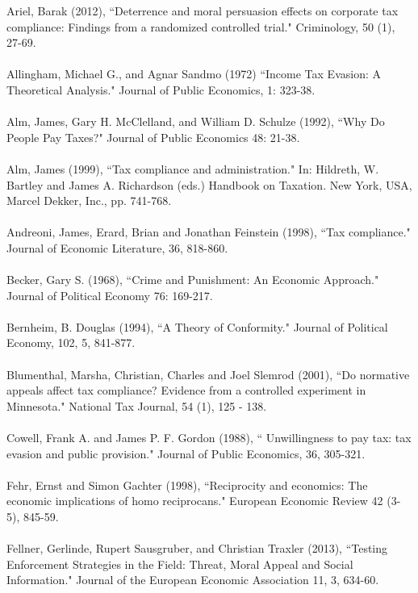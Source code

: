 \documentclass[12pt,titlepage]{article}
\begin{document}
Ariel, Barak (2012), ``Deterrence and moral persuasion effects on
corporate tax compliance: Findings from a randomized controlled
trial." Criminology, 50 (1), 27-69. \\
\\
Allingham, Michael G., and Agnar Sandmo (1972) ``Income Tax Evasion: A Theoretical
Analysis." Journal of Public Economics, 1: 323-38. \\
\\
Alm, James, Gary H. McClelland, and William D. Schulze (1992), ``Why Do People
Pay Taxes?" Journal of Public Economics 48: 21-38. \\
\\
Alm, James (1999), ``Tax compliance and administration." In: Hildreth, W. Bartley and James A. Richardson
(eds.) Handbook on Taxation. New York, USA, Marcel Dekker, Inc., pp. 741-768. \\
\\
Andreoni, James, Erard, Brian and Jonathan Feinstein (1998), ``Tax compliance." Journal of Economic
Literature, 36, 818-860. \\
\\
Becker, Gary S. (1968), ``Crime and Punishment: An Economic Approach."
Journal of Political Economy 76: 169-217.\\
\\
Bernheim, B. Douglas (1994), ``A Theory of Conformity." Journal of Political Economy, 102, 5, 841-877. \\
\\
Blumenthal, Marsha, Christian, Charles and Joel Slemrod (2001), ``Do normative appeals affect tax
compliance? Evidence from a controlled experiment in Minnesota." National Tax Journal, 54 (1),
125 - 138. \\
\\
Cowell, Frank A. and James P. F. Gordon (1988), `` Unwillingness to pay tax: tax evasion and public provision."
Journal of Public Economics, 36, 305-321.\\
\\
Fehr, Ernst and Simon Gachter (1998), ``Reciprocity and economics: The economic implications of homo
reciprocans." European Economic Review 42 (3-5), 845-59. \\
\\
Fellner, Gerlinde, Rupert Sausgruber, and Christian Traxler (2013), ``Testing Enforcement Strategies in the Field: Threat, Moral Appeal and Social Information." Journal of the European Economic Association 11, 3, 634-60.\\
\\
\end{document}
